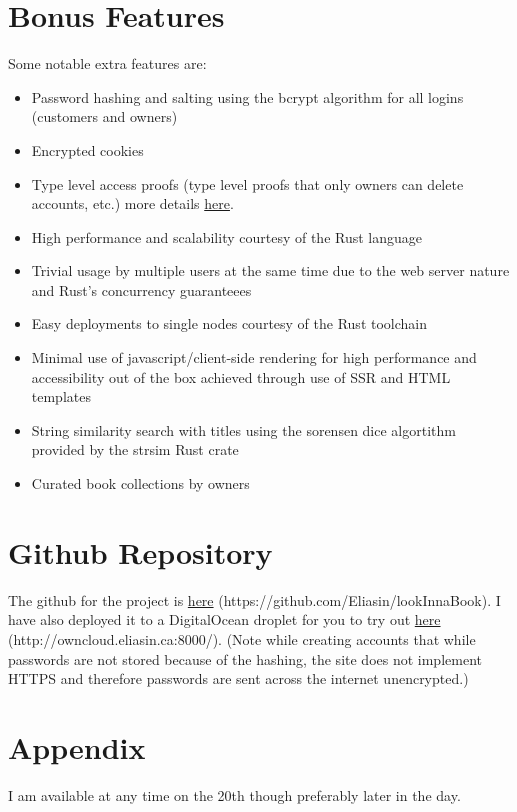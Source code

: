 \documentclass{article}
\begin{document}
\section{Bonus Features}
Some notable extra features are:
\begin{itemize}
  \item Password hashing and salting using the bcrypt algorithm for all logins (customers and owners)
  \item Encrypted cookies
  \item Type level access proofs (type level proofs that only owners can delete accounts, etc.) more details \href{https://rocket.rs/v0.4/guide/requests/#custom-guards}{here}.
  \item High performance and scalability courtesy of the Rust language
  \item Trivial usage by multiple users at the same time due to the web server nature and Rust's concurrency guaranteees
  \item Easy deployments to single nodes courtesy of the Rust toolchain
  \item Minimal use of javascript/client-side rendering for high performance and accessibility out of the box achieved through use of SSR and HTML templates
  \item String similarity search with titles using the sorensen dice algortithm provided by the strsim Rust crate
  \item Curated book collections by owners
\end{itemize}


\section{Github Repository}
The github for the project is \href{https://github.com/Eliasin/lookInnaBook}{here} (https://github.com/Eliasin/lookInnaBook). I have also deployed it to a DigitalOcean droplet for you to try out \href{http://owncloud.eliasin.ca:8000/}{here} (http://owncloud.eliasin.ca:8000/). (Note while creating accounts that while passwords are not stored because of the hashing, the site does not implement HTTPS and therefore passwords are sent across the internet unencrypted.)

\section{Appendix}
I am available at any time on the 20th though preferably later in the day.
\end{document}
